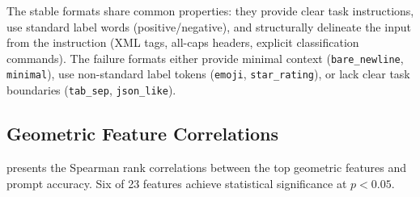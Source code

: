 The stable formats share common properties: they provide clear task instructions, use standard label words (positive/negative), and structurally delineate the input from the instruction (XML tags, all-caps headers, explicit classification commands).
The failure formats either provide minimal context (\texttt{bare\_newline}, \texttt{minimal}), use non-standard label tokens (\texttt{emoji}, \texttt{star\_rating}), or lack clear task boundaries (\texttt{tab\_sep}, \texttt{json\_like}).

\subsection{Geometric Feature Correlations}
\label{sec:correlations}

 presents the Spearman rank correlations between the top geometric features and prompt accuracy.
Six of 23 features achieve statistical significance at $p < 0.05$.

\begin{table}[t]
    \centering
    \caption{Top geometric features ranked by absolute Spearman correlation with prompt accuracy. Asterisks (*) denote $p < 0.05$. Bootstrap 95\% CIs computed with 10{,}000 resamples. The permutation test for the top feature yields $p = 0.036$ (5{,}000 permutations).}
    \label{tab:correlations}
\end{table}


